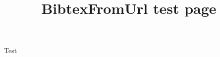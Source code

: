 \documentclass[12pt,a4paper]{article}
\begin{document}
\title{BibtexFromUrl test page}

\maketitle

Test\cite{test1} \cite{test2} \cite{select}


\raggedright

\end{document}
